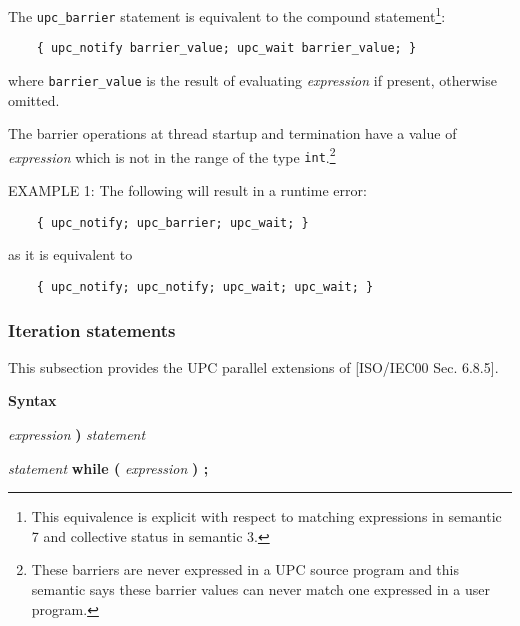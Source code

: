 
\np The {\tt upc\_barrier} statement is equivalent to the
    compound statement\footnote{This equivalence is explicit with
    respect to matching expressions in semantic 7 and collective
    status in semantic 3.}:

\begin{verbatim}
    { upc_notify barrier_value; upc_wait barrier_value; }
\end{verbatim}

    where {\tt barrier\_value} is the result of evaluating {\em expression}
    if present, otherwise omitted.

\np The barrier operations at thread
    startup and termination have a value of {\em expression} which is not in
    the range of the type {\tt int}.\footnote{These barriers are never expressed
    in a UPC source program and this semantic says these barrier values can
    never match one expressed in a user program.}

\np EXAMPLE 1:  The following will result in a runtime error:  
\begin{verbatim}
    { upc_notify; upc_barrier; upc_wait; }                 
\end{verbatim}

    as it is equivalent to 

\begin{verbatim}
    { upc_notify; upc_notify; upc_wait; upc_wait; } 
\end{verbatim}

\subsubsection{Iteration statements}

\npf This subsection provides the UPC parallel extensions of
    [ISO/IEC00 Sec. 6.8.5].

{\bf Syntax} 


\hspace{3em}{\bf while (} {\em expression} {\bf )} {\em statement}

\hspace{3em}{\bf do} {\em statement} {\bf while (} {\em expression} {\bf ) ;}

